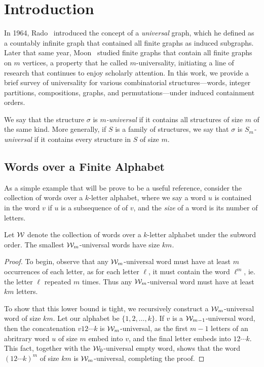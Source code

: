 \chapter{Introduction}
\label{chap-introduction}

In 1964, Rado~\cite{rado:universal-graph:} introduced the concept of a \emph{universal} graph, which he defined as a countably infinite graph that contained all finite graphs as induced subgraphs. Later that same year, Moon~\cite{moon:on-minimal-n-un:} studied finite graphs that contain all finite graphs on $m$ vertices, a property that he called $m$-universality, initiating a line of research that continues to enjoy scholarly attention. In this work, we provide a brief survey of universality for various combinatorial structures---words, integer partitions, compositions, graphs, and permutations---under induced containment orders.

We say that the structure $\sigma$ is \emph{$m$-universal} if it contains all structures of size $m$ of the same kind. More generally, if $S$ is a family of structures, we say that $\sigma$ is \emph{$S_m$-universal} if it contains every structure in $S$ of size $m$.

\section{Words over a Finite Alphabet}
\label{sec-words}

As a simple example that will be prove to be a useful reference, consider the collection of words over a $k$-letter alphabet, where we say a word $u$ is contained in the word $v$ if $u$ is a subsequence of of $v$, and the \emph{size} of a word is its number of letters. 
\begin{proposition}
\label{prop-word-universal}
	Let $\mathcal{W}$ denote the collection of words over a $k$-letter alphabet under the subword order. The smallest $\mathcal{W}_m$-universal words have size $km$.
\end{proposition}
\begin{proof}
	To begin, observe that any $\mathcal{W}_m$-universal word must have at least $m$ occurrences of each letter, as for each letter $\ell$, it must contain the word $\ell^m$, ie. the letter $\ell$ repeated $m$ times. Thus any $\mathcal{W}_m$-universal word must have at least $km$ letters.

	To show that this lower bound is tight, we recursively construct a $\mathcal{W}_m$-universal word of size $km$. Let our alphabet be $\{1, 2, \dots, k\}$. If $v$ is a $\mathcal{W}_{m-1}$-universal word, then the concatenation $v 12\cdots k$ is $\mathcal{W}_m$-universal, as the first $m-1$ letters of an abritrary word $u$ of size $m$ embed into $v$, and the final letter embeds into $12\cdots k$. This fact, together with the $\mathcal{W}_0$-universal empty word, shows that the word $(12 \cdots k)^m$ of size $km$ is $\mathcal{W}_m$-universal, completing the proof.
\end{proof}

